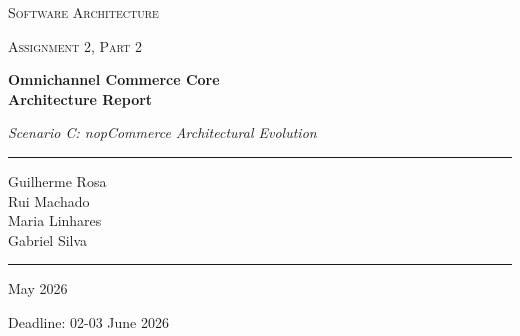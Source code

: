 \documentclass[12pt,a4paper]{report}
\begin{document}
\begin{titlepage}
    \centering
    \vspace*{2cm}
    {\scshape\LARGE Software Architecture \par}
    \vspace{0.5cm}
    {\scshape\large Assignment 2, Part 2 \par}
    \vspace{1.5cm}
    {\Huge\bfseries Omnichannel Commerce Core\\[0.4em]
    \Large Architecture Report \par}
    \vspace{0.5cm}
    {\large\itshape Scenario C: nopCommerce Architectural Evolution \par}
    \vspace{2cm}
    \rule{\textwidth}{0.5pt}
    \vspace{0.5cm}
    {\large
    Guilherme Rosa\\
    Rui Machado\\
    Maria Linhares\\
    Gabriel Silva \par}
    \vspace{0.5cm}
    \rule{\textwidth}{0.5pt}
    \vspace{1.5cm}
    {\large May 2026 \par}
    \vfill
    {\small Deadline: 02-03 June 2026}
\end{titlepage}

\tableofcontents
\listoffigures
\listoftables
\newpage










\end{document}
